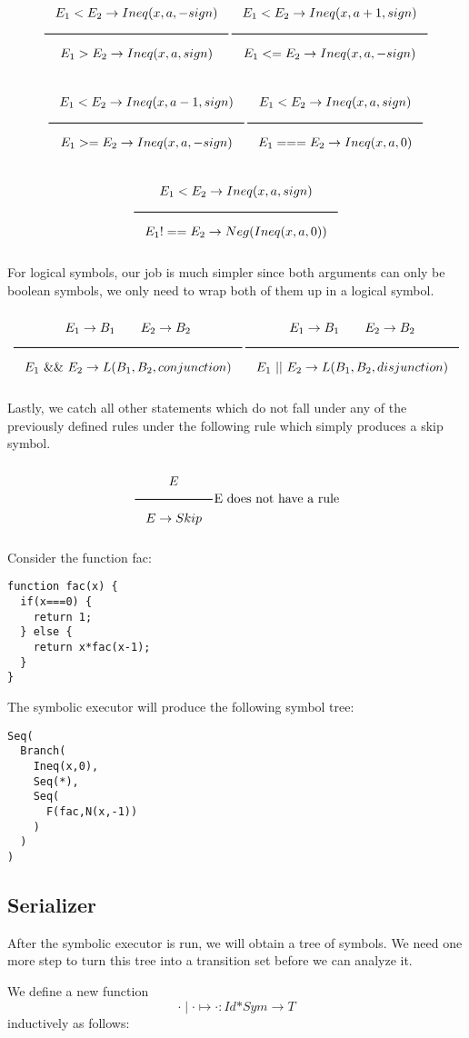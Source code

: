 \[
\Rule{E_1 < E_2 \eval Ineq(x,a,-sign)}
      {E_1 > E_2 \eval Ineq(x,a,sign)} \hfill
\Rule{E_1 < E_2 \eval Ineq(x,a+1,sign)}
      {E_1 <= E_2 \eval Ineq(x,a,-sign)}
\]

\[
\Rule{E_1 < E_2 \eval Ineq(x,a-1,sign)}
     {E_1 >= E_2 \eval Ineq(x,a,-sign)} \hfill
\Rule{E_1 < E_2 \eval Ineq(x,a,sign)}
     {E_1 === E_2 \eval Ineq(x,a,0)} \hfill
\]

\[      
\Rule{E_1 < E_2 \eval Ineq(x,a,sign)}
     {E_1 !== E_2 \eval Neg(Ineq(x,a,0))}
\]

\noindent
For logical symbols, our job is much simpler since both arguments can only be boolean symbols, we only need to wrap both of them up in a logical symbol.

\[    
\Rule{E_1 \eval B_1 \qquad E_2 \eval B_2}
      {E_1\ \&\&\ E_2 \eval L(B_1,B_2,conjunction)} \hfill
\Rule{E_1 \eval B_1 \qquad E_2 \eval B_2}
      {E_1\ ||\ E_2 \eval L(B_1,B_2,disjunction)}
\]

\noindent
Lastly, we catch all other statements which do not fall under any of the previously defined rules under the following rule which simply produces a skip symbol.

\[
\Rule{E}
     {E \eval Skip}
\text{E does not have a rule}
\]

\begin{example}
  Consider the function fac:
\begin{lstlisting}
function fac(x) {
  if(x===0) {
    return 1;
  } else {
    return x*fac(x-1);
  }
}
\end{lstlisting}

\noindent
The symbolic executor will produce the following symbol tree:
\begin{lstlisting}
Seq(
  Branch(
    Ineq(x,0),
    Seq(*),
    Seq(
      F(fac,N(x,-1))
    )
  )
)
\end{lstlisting}

\end{example}



\subsection{Serializer}
After the symbolic executor is run, we will obtain a tree of symbols. 
We need one more step to turn this tree into a transition set before we can analyze it.

\noindent
We define a new function
\[
\cdot \mid \cdot \mapsto \cdot: Id\boldsymbol{*} Sym\to T
\]
inductively as follows:

